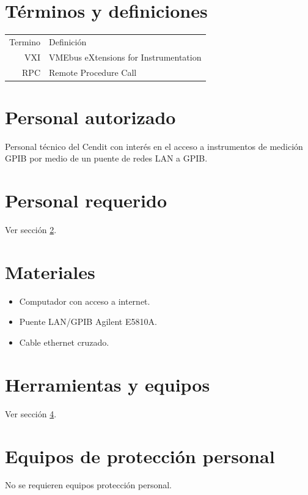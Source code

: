 \documentclass[paper=letter,oneside,fontsize=11pt, parskip=full]{scrartcl}
\begin{document}
	
	\section{Términos y definiciones}
	
		\begin{tabular}{rl}
			Termino 	& 	Definición \\	
			VXI			& 	VMEbus eXtensions for Instrumentation \\
			RPC			& 	Remote Procedure Call \\
		\end{tabular}
	
	\section{Personal autorizado}	
		\label{Sec:PersonalAutorizado}		
		Personal técnico del Cendit con interés en el acceso a instrumentos de medición GPIB por medio de un puente de redes LAN a GPIB.
		
	\section{Personal requerido}	
		
		Ver sección \ref{Sec:PersonalAutorizado}.
		
	\section{Materiales}
	
		\label{Sec:SeccionMateriales}
		\begin{itemize}
			\item Computador con acceso a internet.
			\item Puente LAN/GPIB Agilent E5810A.
			\item Cable ethernet cruzado.
		\end{itemize}	
			
	\section{Herramientas y equipos}
		
		Ver sección \ref{Sec:SeccionMateriales}.

	
	\section{Equipos de protección personal}
	
		No se requieren equipos protección personal.
		
\end{document}
